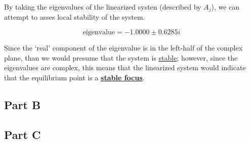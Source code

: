 \noindent By taking the eigenvalues of the linearized systen (described by $A_j$), we can attempt to asses local stability of the system.

$$
\text{eigenvalue} = -1.0000 \pm 0.6285i
$$

\noindent Since the `real' component of the eigenvalue is in the left-half of the complex plane, than we would presume that the system is \underline{stable}; however, since the eigenvalues are complex, this means that the linearized system would indicate that the equilibrium point is a \underline{\textbf{stable focus}}.

\subsection*{Part B}

\subsection*{Part C}
